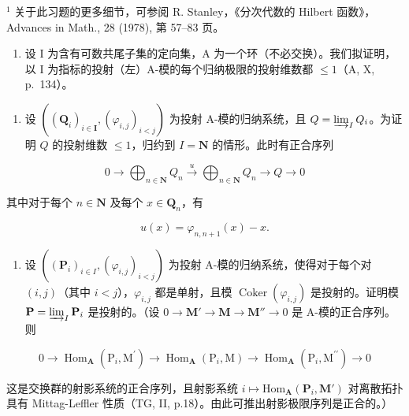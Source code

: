 \(^{1}\) 关于此习题的更多细节，可参阅 R. Stanley，《分次代数的 Hilbert 函数》，Advances in Math., 28 (1978), 第 57–83 页。

\begin{enumerate}
\def\labelenumi{\arabic{enumi})}
\setcounter{enumi}{6}
\tightlist
\item
  设 I 为含有可数共尾子集的定向集，A 为一个环（不必交换）。我们拟证明，以 I 为指标的投射（左）A-模的每个归纳极限的投射维数都 \(\leqslant 1\)（A, X, p.~134）。
\end{enumerate}

\begin{enumerate}
\def\labelenumi{\alph{enumi})}
\tightlist
\item
  设 \(((\mathbf{Q}_i)_{i\in \mathbf{I}},(\varphi_{i,j})_{i < j})\) 为投射 A-模的归纳系统，且 \(Q = \varinjlim_{I} Q_i\)。为证明 \(Q\) 的投射维数 \(\leqslant 1\)，归约到 \(I = \mathbf{N}\) 的情形。此时有正合序列
\end{enumerate}

\[
0 \longrightarrow \bigoplus_ {n \in \mathbf {N}} Q _ {n} \stackrel {u} {\longrightarrow} \bigoplus_ {n \in \mathbf {N}} Q _ {n} \longrightarrow Q \longrightarrow 0
\]

其中对于每个 \(n \in \mathbf{N}\) 及每个 \(x \in \mathbf{Q}_n\)，有

\[
u (x) = \varphi_ {n, n + 1} (x) - x.
\]

\begin{enumerate}
\def\labelenumi{\alph{enumi})}
\setcounter{enumi}{1}
\tightlist
\item
  设 \(((\mathbf{P}_i)_{i\in I}, (\varphi_{i,j})_{i < j})\) 为投射 A-模的归纳系统，使得对于每个对 \((i,j)\)（其中 \(i < j\)），\(\varphi_{i,j}\) 都是单射，且模 \(\operatorname{Coker}(\varphi_{i,j})\) 是投射的。证明模 \(\mathbf{P} = \varinjlim_{I} \mathbf{P}_i\) 是投射的。（设 \(0 \to \mathbf{M}' \to \mathbf{M} \to \mathbf{M}'' \to 0\) 是 A-模的正合序列。则
\end{enumerate}

\[
0 \to \operatorname{Hom} _ {\mathbf {A}} (\mathrm{P} _ {i}, \mathrm{M} ^ {\prime}) \to \operatorname{Hom} _ {\mathbf {A}} (\mathrm{P} _ {i}, \mathrm{M}) \to \operatorname{Hom} _ {\mathbf {A}} (\mathrm{P} _ {i}, \mathrm{M} ^ {\prime \prime}) \to 0
\]

这是交换群的射影系统的正合序列，且射影系统 \(i \mapsto \mathrm{Hom}_{\mathbf{A}}(\mathbf{P}_{i}, \mathbf{M}')\) 对离散拓扑具有 Mittag-Leffler 性质（TG, II, p.18）。由此可推出射影极限序列是正合的。）

